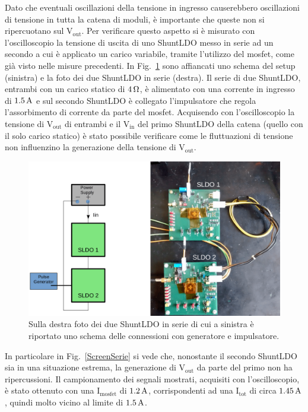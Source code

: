 Dato che eventuali oscillazioni della tensione in ingresso causerebbero oscillazioni di tensione in tutta la catena di moduli, è importante che queste non si ripercuotano sul $\mathrm{V_{out}}$. 
Per verificare questo aspetto si è misurato con l'oscilloscopio la tensione di uscita di uno ShuntLDO messo in serie ad un secondo a cui è applicato un carico variabile, tramite l'utilizzo del mosfet, come già visto nelle misure precedenti.
In Fig.~\ref{SLDOserie} sono affiancati uno schema del setup (sinistra) e la foto dei due ShuntLDO in serie (destra). 
Il serie di due ShuntLDO, entrambi con un carico statico di $4 {\rm \, \Omega}$, è alimentato con una corrente in ingresso di $1.5 \rm \, A$ e sul secondo ShuntLDO è collegato l'impulsatore che regola l'assorbimento di corrente  da parte del mosfet. 
Acquisendo con l'oscilloscopio la tensione di $\mathrm{V_{out}}$ di entrambi e il $\mathrm{V_{in}}$ del primo ShuntLDO della catena (quello con il solo carico statico) è stato possibile verificare come le fluttuazioni di tensione non influenzino la generazione della tensione di $\mathrm{V_{out}}$.
\begin{figure}[h!]
\centering
\includegraphics[scale=.30]{Immagini/SLDOserie}
\caption{Sulla destra foto dei due ShuntLDO in serie di cui a sinistra è riportato uno schema delle connessioni con generatore e impulsatore.}
\label{SLDOserie}
\end{figure}
In particolare in Fig.~\ref{ScreenSerie} si vede che, nonostante il secondo ShuntLDO sia in una situazione estrema, la generazione di $\mathrm{V_{out}}$ da parte del primo non ha ripercussioni. 
Il campionamento dei segnali mostrati, acquisiti con l'oscilloscopio, è stato ottenuto con una $\mathrm{I_{mosfet}}$ di $1.2 \rm \, A$, corrispondenti ad una $\mathrm{I_{tot}}$ di circa $1.45 \rm \, A$, quindi molto vicino al limite di $1.5 \rm \, A$. 

